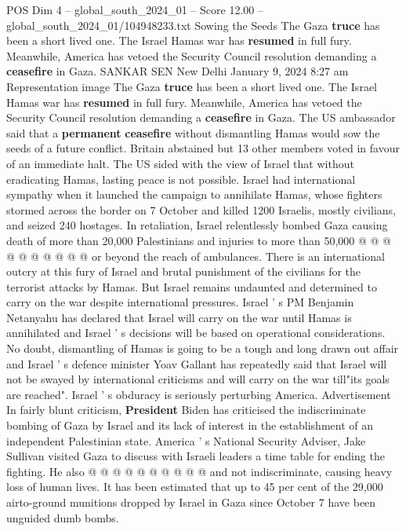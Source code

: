 \begin{textsample}{POS Dim 4 – global\_south\_2024\_01 – Score 12.00 – global\_south\_2024\_01/104948233.txt}  \label{ex:f4_pos_380}
Sowing the Seeds The Gaza \textbf{truce} has been a short lived one.
The Israel Hamas war has \textbf{resumed} in full fury.
Meanwhile, America has vetoed the Security Council resolution demanding a \textbf{ceasefire} in Gaza.
SANKAR SEN New Delhi January 9, 2024 8:27 am Representation image The Gaza \textbf{truce} has been a short lived one.
The Israel Hamas war has \textbf{resumed} in full fury.
Meanwhile, America has vetoed the Security Council resolution demanding a \textbf{ceasefire} in Gaza.
The US ambassador said that a \textbf{permanent} \textbf{ceasefire} without dismantling Hamas would sow the seeds of a future conflict.
Britain abstained but 13 other members voted in favour of an immediate halt.
The US sided with the view of Israel that without eradicating Hamas, lasting peace is not possible.
Israel had international sympathy when it launched the campaign to annihilate Hamas, whose fighters stormed across the border on 7 October and killed 1200 Israelis, mostly civilians, and seized 240 hostages.
In retaliation, Israel relentlessly bombed Gaza causing death of more than 20,000 Palestinians and injuries to more than 50,000 @ @ @ @ @ @ @ @ @ @ or beyond the reach of ambulances.
There is an international outcry at this fury of Israel and brutal punishment of the civilians for the terrorist attacks by Hamas.
But Israel remains undaunted and determined to carry on the war despite international pressures.
Israel ' s PM Benjamin Netanyahu has declared that Israel will carry on the war until Hamas is annihilated and Israel ' s decisions will be based on operational considerations.
No doubt, dismantling of Hamas is going to be a tough and long drawn out affair and Israel ' s defence minister Yoav Gallant has repeatedly said that Israel will not be swayed by international criticisms and will carry on the war till"its goals are reached".
Israel ' s obduracy is seriously perturbing America.
Advertisement In fairly blunt criticism, \textbf{President} Biden has criticised the indiscriminate bombing of Gaza by Israel and its lack of interest in the establishment of an independent Palestinian state.
America ' s National Security Adviser, Jake Sullivan visited Gaza to discuss with Israeli leaders a time table for ending the fighting.
He also @ @ @ @ @ @ @ @ @ @ and not indiscriminate, causing heavy loss of human lives.
It has been estimated that up to 45 per cent of the 29,000 airto-ground munitions dropped by Israel in Gaza since October 7 have been unguided dumb bombs.

\end{textsample}
